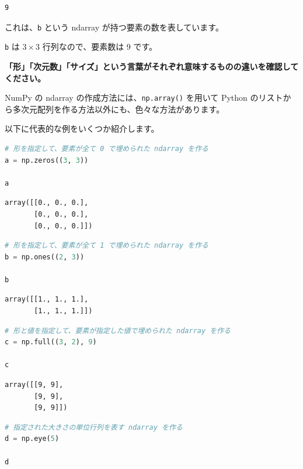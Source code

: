 \begin{lstlisting}[style=outputcell]
9
\end{lstlisting}

これは、\texttt{b} という ndarray が持つ要素の数を表しています。

\texttt{b} は $3 \times 3$ 行列なので、要素数は 9 です。

\textbf{「形」「次元数」「サイズ」という言葉がそれぞれ意味するものの違いを確認してください。}


NumPy の ndarray の作成方法には、\texttt{np.array()} を用いて Python のリストから多次元配列を作る方法以外にも、色々な方法があります。

以下に代表的な例をいくつか紹介します。


\begin{lstlisting}[style=codecell,language=Python]
# 形を指定して、要素が全て 0 で埋められた ndarray を作る
a = np.zeros((3, 3))

a
\end{lstlisting}

\begin{lstlisting}[style=outputcell]
array([[0., 0., 0.],
       [0., 0., 0.],
       [0., 0., 0.]])
\end{lstlisting}

\begin{lstlisting}[style=codecell,language=Python]
# 形を指定して、要素が全て 1 で埋められた ndarray を作る
b = np.ones((2, 3))

b
\end{lstlisting}

\begin{lstlisting}[style=outputcell]
array([[1., 1., 1.],
       [1., 1., 1.]])
\end{lstlisting}

\begin{lstlisting}[style=codecell,language=Python]
# 形と値を指定して、要素が指定した値で埋められた ndarray を作る
c = np.full((3, 2), 9)

c
\end{lstlisting}

\begin{lstlisting}[style=outputcell]
array([[9, 9],
       [9, 9],
       [9, 9]])
\end{lstlisting}

\begin{lstlisting}[style=codecell,language=Python]
# 指定された大きさの単位行列を表す ndarray を作る
d = np.eye(5)

d
\end{lstlisting}

